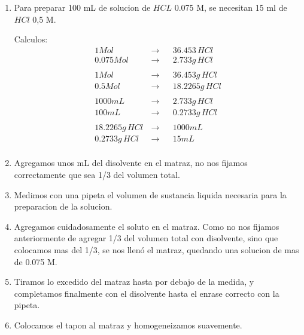 \documentclass[12pt,a4paper]{report}
\begin{document}
\chapter{}
\begin{enumerate}[label=\alph*]
  \item Para preparar 100 mL de solucion de $HCL$ 0.075 M, se necesitan 15 ml de $HCl$ 0,5 M.

  Calculos:
      $$
\begin{aligned}
   1 Mol  \, &\rightarrow&& 36.453 \,HCl\\[6pt]
   0.075 Mol  \, &\rightarrow&&  2.733g \,HCl\\[6pt]
    \\
   1 Mol  \, &\rightarrow&& 36.453g \,HCl\\[6pt]
   0.5 Mol  \, &\rightarrow&&  18.2265g \,HCl\\[6pt]
    \\
   1000mL \,  &\rightarrow&& 2.733g \,HCl\\[6pt]
    100mL\,  &\rightarrow&& 0.2733g \,HCl\\[6pt]
    \\
   18.2265g \,HCl \,  &\rightarrow&& 1000 mL\\[6pt]
    0.2733 g \,HCl &\rightarrow&& 15 mL\\[6pt]
\end{aligned}
$$

  \item Agregamos unos mL del disolvente en el matraz, no nos fijamos correctamente que sea 1/3 del volumen total.

  \item Medimos con una pipeta el volumen de sustancia liquida necesaria para la preparacion de la solucion.

  \item Agregamos cuidadosamente el soluto en el matraz. Como no nos fijamos anteriormente de agregar 1/3 del volumen total con disolvente, sino que colocamos mas del 1/3, se nos llenó el matraz, quedando una solucion de mas de 0.075 M.

  \item Tiramos lo excedido del matraz hasta por debajo de la medida, y completamos finalmente con el disolvente hasta el enrase correcto con la pipeta.

  \item Colocamos el tapon al matraz y homogeneizamos suavemente.
\end{enumerate}
\end{document}
